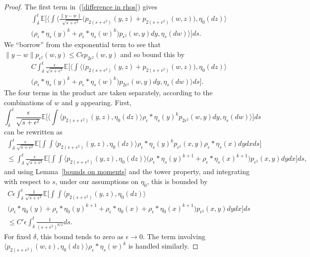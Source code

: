 \documentclass[EJP]{ejpecp} %
\newcommand{\IE}{\mathbb E}
\begin{document}
\begin{proof}
The first term in~(\ref{difference in rhos}) gives
\begin{multline*}
\int_\delta^t\IE\Big[\Big\langle\int
	\big\langle\frac{\|y-w\|}{\sqrt{s+\epsilon^2}}
\big(p_{2(s+\epsilon^2)}(y,z)+p_{2(s+\epsilon^2)}(w,z)\big),\eta_0(dz)\big\rangle
\\
\big(\rho_\epsilon*\eta_s(y)^k+\rho_\epsilon*\eta_s(w)^k\big)
p_{\epsilon^2}(w,y)dy, \eta_s(dw)\Big\rangle\Big] ds.
\end{multline*}
We ``borrow'' from the exponential term to see that 
$\|y-w\|p_{\epsilon^2}(w,y)\leq C\epsilon p_{2\epsilon^2}(w,y)$
and so bound
this by
\begin{multline}
C\int_\delta^t\frac{\epsilon}{\sqrt{s+\epsilon^2}}
\IE\Big[\Big\langle\int\big\langle
\big(p_{2(s+\epsilon^2)}(y,z)+p_{2(s+\epsilon^2)}(w,z)\big),\eta_0(dz)
\big\rangle
\\
\big(\rho_\epsilon*\eta_s(y)^k+\rho_\epsilon*\eta_s(w)^k\big)
p_{2\epsilon^2}(w,y)dy, \eta_s(dw)\Big\rangle ds\Big] .
\label{contribution from initial condition terms}
\end{multline}
The four terms in the product are taken separately, according to the
combinations of $w$ and $y$ appearing. First,
\[
\int_\delta^t\frac{\epsilon}{\sqrt{s+\epsilon^2}}
\IE\Big[\Big\langle\int\big\langle
p_{2(s+\epsilon^2)}(y,z)   
,\eta_0(dz)
\big\rangle
\rho_\epsilon*\eta_s(y)^k 
p_{2\epsilon^2}(w,y)dy, \eta_s(dw)\Big\rangle  \Big] ds
\]
can be rewritten as
\begin{multline*}
\int_\delta^t\frac{\epsilon}{\sqrt{s+\epsilon^2}}
\IE\Big[\int\int\big\langle
p_{2(s+\epsilon^2)}(y,z)  
,\eta_0(dz)
\big\rangle
\rho_\epsilon*\eta_s(y)^k 
p_{\epsilon^2}(x,y) \rho_\epsilon*\eta_s(x) dy dx ds \Big]
\\
\leq
\int_\delta^t\frac{\epsilon}{\sqrt{s+\epsilon^2}}
\IE\Big[\int\int\big\langle
p_{2(s+\epsilon^2)}(y,z)  
,\eta_0(dz)
\big\rangle
\big(\rho_\epsilon*\eta_s(y)^{k+1} +\rho_\epsilon*\eta_s(x)^{k+1}\big)
p_{\epsilon^2}(x,y) dy dx \Big] ds,
\end{multline*}
and using Lemma~\ref{bounds on moments} and the tower property, and integrating
with respect to $s$, under our assumptions on $\eta_0$,
this is 
bounded by
\begin{multline*}
C\epsilon \int_\delta^t\frac{1}{\sqrt{s+\epsilon^2}}
\IE\Big[\int\int\big\langle
p_{2(s+\epsilon^2)}(y,z)  
,\eta_0(dz)
\big\rangle
\\
\big(\rho_\epsilon*\eta_0(y)+\rho_\epsilon*\eta_0(y)^{k+1} 
+\rho_\epsilon*\eta_0(x)
+\rho_\epsilon*\eta_0(x)^{k+1}\big)
p_{\epsilon^2}(x,y) dy dx \Big] ds 
\\
\le C'\epsilon\int_\delta^t\frac{1}{(s+\epsilon^2)^{d/2}}ds .
\end{multline*}
For fixed $\delta$, this bound tends to zero as $\epsilon\to 0$.
The term involving 
$ 
\big\langle
p_{2(s+\epsilon^2)}(w,z)   
,\eta_0(dz)
\big\rangle
\rho_\epsilon*\eta_s(w)^k
$ 
is handled similarly.


\end{proof}
\end{document}
